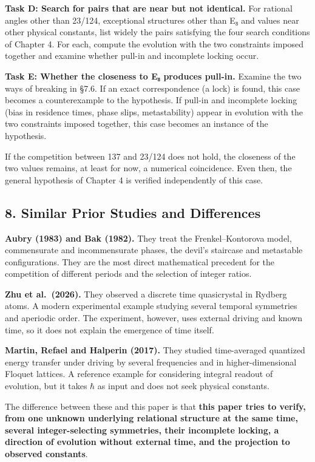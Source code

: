 \documentclass[
  a4paper,
]{article}
\begin{document}
\textbf{Task D: Search for pairs that are near but not identical.} For
rational angles other than 23/124, exceptional structures other than E₈
and values near other physical constants, list widely the pairs
satisfying the four search conditions of Chapter 4. For each, compute
the evolution with the two constraints imposed together and examine
whether pull-in and incomplete locking occur.

\textbf{Task E: Whether the closeness to E₈ produces pull-in.} Examine
the two ways of breaking in §7.6. If an exact correspondence (a lock) is
found, this case becomes a counterexample to the hypothesis. If pull-in
and incomplete locking (bias in residence times, phase slips,
metastability) appear in evolution with the two constraints imposed
together, this case becomes an instance of the hypothesis.

If the competition between 137 and 23/124 does not hold, the closeness
of the two values remains, at least for now, a numerical coincidence.
Even then, the general hypothesis of Chapter 4 is verified independently
of this case.

\subsection{8. Similar Prior Studies and
Differences}\label{similar-prior-studies-and-differences}

\textbf{Aubry (1983) and Bak (1982).} They treat the Frenkel--Kontorova
model, commensurate and incommensurate phases, the devil's staircase and
metastable configurations. They are the most direct mathematical
precedent for the competition of different periods and the selection of
integer ratios.

\textbf{Zhu et al.~(2026).} They observed a discrete time quasicrystal
in Rydberg atoms. A modern experimental example studying several
temporal symmetries and aperiodic order. The experiment, however, uses
external driving and known time, so it does not explain the emergence of
time itself.

\textbf{Martin, Refael and Halperin (2017).} They studied time-averaged
quantized energy transfer under driving by several frequencies and in
higher-dimensional Floquet lattices. A reference example for considering
integral readout of evolution, but it takes \(\hbar\) as input and does
not seek physical constants.

The difference between these and this paper is that \textbf{this paper
tries to verify, from one unknown underlying relational structure at the
same time, several integer-selecting symmetries, their incomplete
locking, a direction of evolution without external time, and the
projection to observed constants}.
\end{document}
